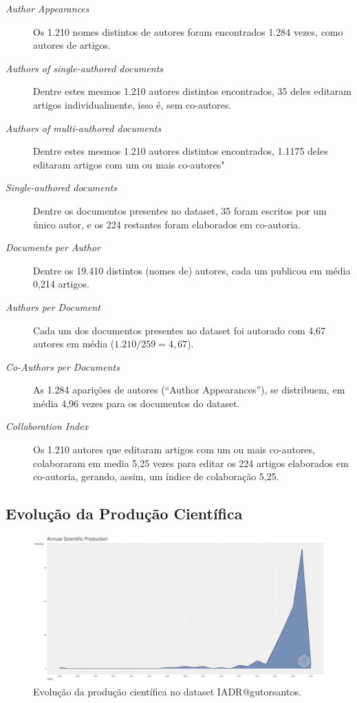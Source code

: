 \begin{description}
    \item [\textit{Author Appearances}] Os 1.210 nomes distintos de autores foram encontrados 1.284 vezes, como autores de artigos.
    \item [\textit{Authors of single-authored documents}] Dentre estes mesmos 1.210 autores distintos encontrados, 35 deles editaram artigos individualmente, isso é, sem co-autores.
    \item [\textit{Authors of multi-authored documents}] Dentre estes mesmos 1.210 autores distintos encontrados, 1.1175 deles editaram artigos com um ou mais co-autores"
    \item [\textit{Single-authored documents}] Dentre os \totalDocuments{} documentos presentes no dataset, 35 foram escritos por um único autor, e os 224 restantes foram elaborados em co-autoria.
    \item [\textit{Documents per Author}] Dentre os 19.410 distintos (nomes de) autores, cada um publicou em média 0,214 artigos.
    \item [\textit{Authors per Document}] Cada um dos \totalDocuments{} documentos presentes no dataset foi autorado com 4,67 autores em média ($1.210 / 259 = 4,67$).
    \item [\textit{Co-Authors per Documents}] As 1.284 aparições de autores (``Author Appearances''), se distribuem, em média 4,96 vezes para os \totalDocuments{} documentos do dataset.
    \item [\textit{Collaboration Index}] Os 1.210 autores que editaram artigos com um ou mais co-autores, colaboraram em media 5,25 vezes para editar os 224 artigos elaborados em co-autoria, gerando, assim, um índice de colaboração 5,25. 
\end{description}

\subsection{Evolução da Produção Científica}

\begin{figure}[H]
    \centering
    \includegraphics[width=1\textwidth]{experiments/gutorsantos/AnaliseBibliometrica/IAeDiscriminacao/imgs/AnnualScientificProduction-2022-02-09.png}
    \caption{Evolução da produção científica no dataset IADR@gutorsantos.}
    \label{fig:evol:anual:IADR@gutorsantos}
\end{figure}

